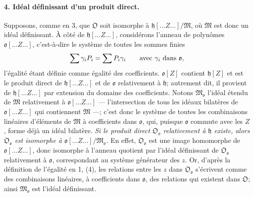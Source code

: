 \paragraph{4. Idéal définissant d'un produit direct.}
Supposons, comme en 3, que \(\mathfrak O\) soit isomorphe à \(\mathfrak h[\ldots Z\ldots]/\mathfrak M\), où \(\mathfrak M\) est donc un idéal définissant. À côté de \(\mathfrak h[\ldots Z\ldots]\), considérons l'anneau de polynômes \(\mathfrak o[\ldots Z\ldots]\), c'est-à-dire le système de toutes les sommes finies
\[
\sum\gamma_iP_i=\sum P_i\gamma_i
\qquad\hbox{avec }\gamma_i\hbox{ dans }\mathfrak o,
\]
l'égalité étant définie comme égalité des coefficients. \(\mathfrak o[Z]\) contient \(\mathfrak h[Z]\) et est le produit direct de \(\mathfrak h[\ldots Z\ldots]\) et de \(\mathfrak o\) relativement à \(\mathfrak h\); autrement dit, il provient de \(\mathfrak h[\ldots Z\ldots]\) par extension du domaine des coefficients. Notons \(\mathfrak M_{\mathfrak o}\) l'idéal étendu de \(\mathfrak M\) relativement à \(\mathfrak o[\ldots Z\ldots]\) --- l'intersection de tous les idéaux bilatères de \(\mathfrak o[\ldots Z\ldots]\) qui contiennent \(\mathfrak M\) ---; c'est donc le système de toutes les combinaisons linéaires d'éléments de \(\mathfrak M\) à coefficients dans \(\mathfrak o\), qui, puisque \(\mathfrak o\) commute avec les \(Z\), forme déjà un idéal bilatère. \emph{Si le produit direct \(\mathfrak O_{\mathfrak o}\) relativement à \(\mathfrak h\) existe, alors \(\mathfrak O_{\mathfrak o}\) est isomorphe à \(\mathfrak o[\ldots Z\ldots]/\mathfrak M_{\mathfrak o}\).} En effet, \(\mathfrak O_{\mathfrak o}\) est une image homomorphe de \(\mathfrak o[\ldots Z\ldots]\), donc isomorphe à l'anneau quotient par l'idéal définissant de \(\mathfrak O_{\mathfrak o}\) relativement à \(\mathfrak o\), correspondant au système générateur des \(z\). Or, d'après la définition de l'égalité en 1, (4), les relations entre les \(z\) dans \(\mathfrak O_{\mathfrak o}\) s'écrivent comme des combinaisons linéaires, à coefficients dans \(\mathfrak o\), des relations qui existent dans \(\mathfrak O\); ainsi \(\mathfrak M_{\mathfrak o}\) est l'idéal définissant.

